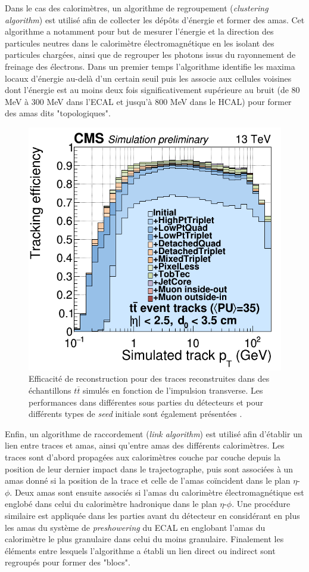 Dans le cas des calorimètres, un algorithme de regroupement (\textit{clustering algorithm}) est utilisé afin de collecter les dépôts d'énergie et former des amas. Cet algorithme a notamment pour but de mesurer l'énergie et la direction des particules neutres dans le calorimètre électromagnétique en les isolant des particules chargées, ainsi que de regrouper les photons issus du rayonnement de freinage des électrons. Dans un premier temps l'algorithme identifie les maxima locaux d'énergie au-delà d'un certain seuil puis les associe aux cellules voisines dont l'énergie est au moins deux fois significativement supérieure au bruit (de $80$ MeV à $300$ MeV dans l'ECAL et jusqu'à 800 MeV dans le HCAL) pour former des amas dits "topologiques". \\

\begin{figure}[!ht]
\centering
    \includegraphics[width=0.6\linewidth]{Chapitre4/Images/MC_eff.png} 
    \caption{Efficacité de reconstruction pour des traces reconstruites dans des échantillons $t\overline{t}$ simulés en fonction de l'impulsion transverse. Les performances dans différentes sous parties du détecteurs et pour différents types de \textit{seed} initiale sont également présentées \cite{Elmetenawee:2020emw}.}
    \label{pttrackefficiency}
\end{figure} 

Enfin, un algorithme de raccordement (\textit{link algorithm}) est utilisé afin d'établir un lien entre traces et amas, ainsi qu'entre amas des différents calorimètres. Les traces sont d'abord propagées aux calorimètres couche par couche depuis la position de leur dernier impact dans le trajectographe, puis sont associées à un amas donné si la position de la trace et celle de l'amas coïncident dans le plan $\eta$-$\phi$. Deux amas sont ensuite associés si l'amas du calorimètre électromagnétique est englobé dans celui du calorimètre hadronique dans le plan $\eta$-$\phi$. Une procédure similaire est appliquée dans les parties avant du détecteur en considérant en plus les amas du système de \textit{preshowering} du ECAL en englobant l'amas du calorimètre le plus granulaire dans celui du moins granulaire. Finalement les éléments entre lesquels l'algorithme a établi un lien direct ou indirect sont regroupés pour former des "blocs".

